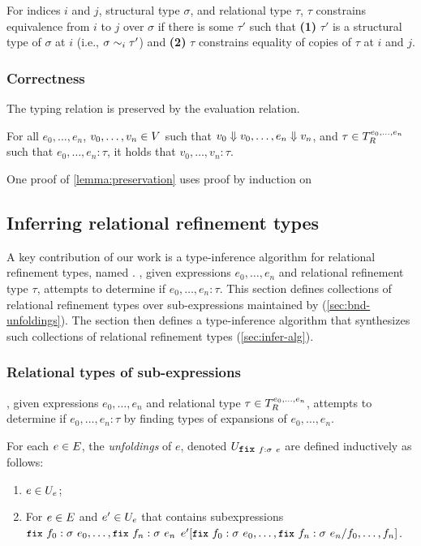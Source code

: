 For indices $i$ and $j$, structural type $\sigma$, and relational type
$\tau$, $\tau$ constrains equivalence from $i$ to $j$ over $\sigma$ if
there is some $\tau'$ such that \textbf{(1)} $\tau'$ is a structural
type of $\sigma$ at $i$ (i.e., $\sigma \sim_{i} \tau'$) and
\textbf{(2)} $\tau$ constrains equality of copies of $\tau$ at $i$ and
$j$.

\subsubsection{Correctness}
\label{sec:corr}

The typing relation is preserved by the evaluation relation.
%
\begin{lemma}
  \label{lemma:preservation}
  For all $e_0, \ldots, e_n$, $v_0, \ldots, v_n \in V$ such that
  $v_0 \Downarrow v_0, \ldots, e_n \Downarrow v_n$, and
  $\tau \in T_{R}^{e_0, \ldots, e_n}$ such that
  $e_0, \ldots, e_n : \tau$, it holds that $v_0, \ldots, v_n : \tau$.
\end{lemma}
%
One proof of \autoref{lemma:preservation} uses proof by induction on
%

\subsection{Inferring relational refinement types}
\label{sec:infer}
%
A key contribution of our work is a type-inference algorithm for
relational refinement types, named \sys.
%
\sys, given expressions $e_0, \ldots, e_n$ and relational refinement
type $\tau$, attempts to determine if $e_0, \ldots, e_n : \tau$.
%
This section defines collections of relational refinement types over
sub-expressions maintained by \sys (\autoref{sec:bnd-unfoldings}).
%
The section then defines a type-inference algorithm that synthesizes
such collections of relational refinement types
(\autoref{sec:infer-alg}).

\subsubsection{Relational types of sub-expressions}
\label{sec:bnd-unfoldings}
%
\sys, given expressions $e_0, \ldots, e_n$ and relational type
$\tau \in T_{R}^{e_0, \ldots, e_n}$, attempts to determine if
$e_0, \ldots, e_n : \tau$ by finding types of expansions of
$e_0, \ldots, e_n$.
%
\begin{defn}
  \label{defn:unfoldings}
  For each $e \in E$, the \emph{unfoldings} of $e$, denoted
  $\unfoldings{ \fix{f}{\sigma}{e} }$ are defined inductively as follows:
  \begin{enumerate}
  \item %
    $e \in U_{ e }$;
  \item %
    For $e \in E$ and $e' \in U_{e}$ that contains
    subexpressions
    $\fix{f_0}{\sigma}{e_0}, \ldots, \fix{f_n}{\sigma}{e_n}$
    $\replace{e'}{f_0, \ldots, f_n}{ \fix{f_0}{\sigma}{e_0}, \ldots,
      \fix{f_n}{\sigma}{e_n} }$.
  \end{enumerate}
\end{defn}
%

